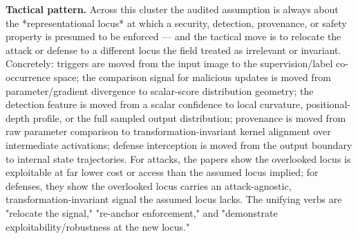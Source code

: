 \begin{tcolorbox}[colback=bgskill!50, colframe=cgreen!70, title={\textbf{C01} \textcolor{gray}{\small (O20/H9/R21)}}, breakable, before skip=4pt, after skip=4pt]
\textbf{Tactical pattern.} Across this cluster the audited assumption is always about the *representational locus* at which a security, detection, provenance, or safety property is presumed to be enforced --- and the tactical move is to relocate the attack or defense to a different locus the field treated as irrelevant or invariant. Concretely: triggers are moved from the input image to the supervision/label co-occurrence space; the comparison signal for malicious updates is moved from parameter/gradient divergence to scalar-score distribution geometry; the detection feature is moved from a scalar confidence to local curvature, positional-depth profile, or the full sampled output distribution; provenance is moved from raw parameter comparison to transformation-invariant kernel alignment over intermediate activations; defense interception is moved from the output boundary to internal state trajectories. For attacks, the papers show the overlooked locus is exploitable at far lower cost or access than the assumed locus implied; for defenses, they show the overlooked locus carries an attack-agnostic, transformation-invariant signal the assumed locus lacks. The unifying verbs are "relocate the signal," "re-anchor enforcement," and "demonstrate exploitability/robustness at the new locus."


\end{tcolorbox}
